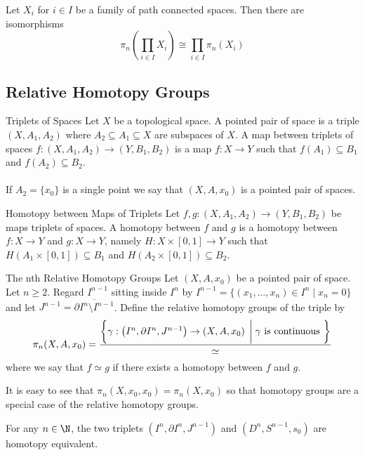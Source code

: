 \documentclass[a4paper]{article}
\begin{document}
\begin{prp}{}{} Let $X_i$ for $i\in I$ be a family of path connected spaces. Then there are isomorphisms $$\pi_n\left(\prod_{i\in I}X_i\right)\cong\prod_{i\in I}\pi_n(X_i)$$
\end{prp}

\subsection{Relative Homotopy Groups}
\begin{defn}{Triplets of Spaces}{} Let $X$ be a topological space. A pointed pair of space is a triple $(X,A_1,A_2)$ where $A_2\subseteq A_1\subseteq X$ are subspaces of $X$. A map between triplets of spaces $f:(X,A_1,A_2)\to(Y,B_1,B_2)$ is a map $f:X\to Y$ such that $f(A_1)\subseteq B_1$ and $f(A_2)\subseteq B_2$. \\~\\
If $A_2=\{x_0\}$ is a single point we say that $(X,A,x_0)$ is a pointed pair of spaces. 
\end{defn}

\begin{defn}{Homotopy between Maps of Triplets}{} Let $f,g:(X,A_1,A_2)\to(Y,B_1,B_2)$ be maps triplets of spaces. A homotopy between $f$ and $g$ is a homotopy between $f:X\to Y$ and $g:X\to Y$, namely $H:X\times[0,1]\to Y$ such that $H(A_1\times[0,1])\subseteq B_1$ and $H(A_2\times[0,1])\subseteq B_2$. 
\end{defn}

\begin{defn}{The nth Relative Homotopy Groups}{} Let $(X,A,x_0)$ be a pointed pair of space. Let $n\geq 2$. Regard $I^{n-1}$ sitting inside $I^n$ by $I^{n-1}=\{(x_1,\dots,x_n)\in I^n\;|\;x_n=0\}$ and let $J^{n-1}=\overline{\partial I^n\setminus I^{n-1}}$. Define the relative homotopy groups of the triple by $$\pi_n(X,A,x_0)=\frac{\left\{\gamma:\left(I^n,\partial I^n,J^{n-1}\right)\to\left(X,A,x_0\right)\;\bigg{|}\;\gamma\text{ is continuous }\right\}}{\simeq}$$ where we say that $f\simeq g$ if there exists a homotopy between $f$ and $g$. 
\end{defn}

It is easy to see that $\pi_n(X,x_0,x_0)=\pi_n(X,x_0)$ so that homotopy groups are a special case of the relative homotopy groups. 

\begin{lmm}{}{} For any $n\in\N$, the two triplets $(I^n,\partial I^n,J^{n-1})$ and $(D^n,S^{n-1},s_0)$ are homotopy equivalent. 
\end{lmm}
\end{document}
